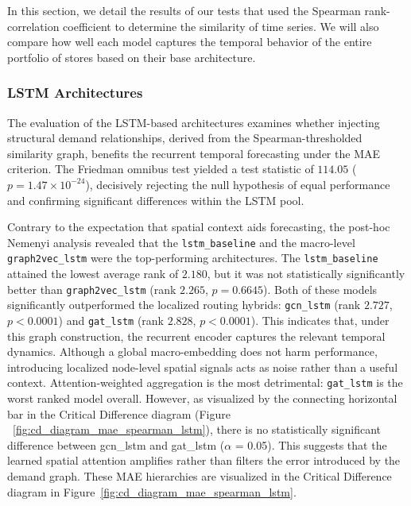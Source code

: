 In this section, we detail the results of our tests that used the Spearman rank-correlation coefficient to determine the similarity of time series. We will also compare how well each model captures the temporal behavior of the entire portfolio of stores based on their base architecture.

\subsubsection{LSTM Architectures}
\label{subsubsec:spearman_lstm}

The evaluation of the LSTM-based architectures examines whether injecting structural demand relationships, derived from the Spearman-thresholded similarity graph, benefits the recurrent temporal forecasting under the MAE criterion. The Friedman omnibus test yielded a test statistic of $114.05$ ($p = 1.47 \times 10^{-24}$), decisively rejecting the null hypothesis of equal performance and confirming significant differences within the LSTM pool.

Contrary to the expectation that spatial context aids forecasting, the post-hoc Nemenyi analysis revealed that the \texttt{lstm\_baseline} and the macro-level \texttt{graph2vec\_lstm} were the top-performing architectures. The \texttt{lstm\_baseline} attained the lowest average rank of $2.180$, but it was not statistically significantly better than \texttt{graph2vec\_lstm} (rank $2.265$, $p = 0.6645$). Both of these models significantly outperformed the localized routing hybrids: \texttt{gcn\_lstm} (rank $2.727$, $p < 0.0001$) and \texttt{gat\_lstm} (rank $2.828$, $p < 0.0001$). This indicates that, under this graph construction, the recurrent encoder captures the relevant temporal dynamics. Although a global macro-embedding does not harm performance, introducing localized node-level spatial signals acts as noise rather than a useful context. Attention-weighted aggregation is the most detrimental: \texttt{gat\_lstm} is the worst ranked model overall. However, as visualized by the connecting horizontal bar in the Critical Difference diagram (Figure ~\ref{fig:cd_diagram_mae_spearman_lstm}), there is no statistically significant difference between gcn\_lstm and gat\_lstm ($\alpha$ = 0.05). This suggests that the learned spatial attention amplifies rather than filters the error introduced by the demand graph. These MAE hierarchies are visualized in the Critical Difference diagram in Figure~\ref{fig:cd_diagram_mae_spearman_lstm}.



